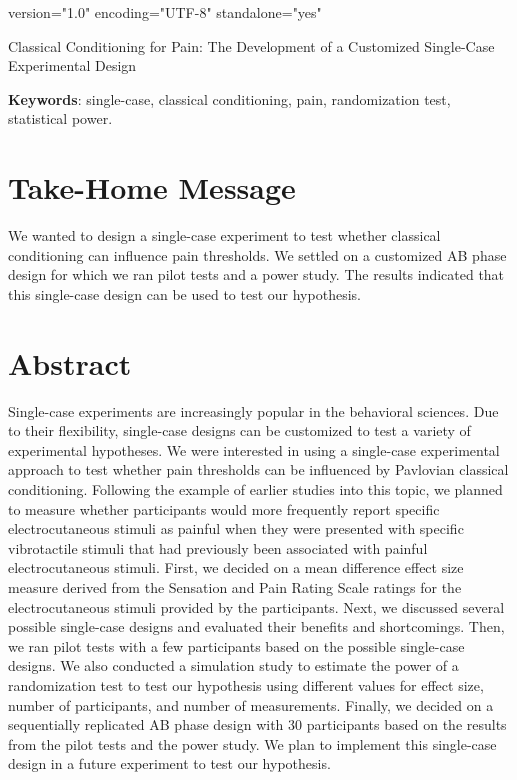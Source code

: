 version="1.0" encoding="UTF-8" standalone="yes" \documentclass{article}
\begin{document}
  

Classical Conditioning for Pain: The Development of a Customized Single-Case Experimental Design









\textbf{Keywords}: single-case, classical conditioning, pain, randomization test, statistical power.

\section{Take-Home Message}

We wanted to design a single-case experiment to test whether classical conditioning can influence pain thresholds. We settled on a customized AB phase design for which we ran pilot tests and a power study. The results indicated that this single-case design can be used to test our hypothesis.

\section{Abstract}

Single-case experiments are increasingly popular in the behavioral sciences. Due to their flexibility, single-case designs can be customized to test a variety of experimental hypotheses. We were interested in using a single-case experimental approach to test whether pain thresholds can be influenced by Pavlovian classical conditioning. Following the example of earlier studies into this topic, we planned to measure whether participants would more frequently report specific electrocutaneous stimuli as painful when they were presented with specific vibrotactile stimuli that had previously been associated with painful electrocutaneous stimuli. First, we decided on a mean difference effect size measure derived from the Sensation and Pain Rating Scale ratings for the electrocutaneous stimuli provided by the participants. Next, we discussed several possible single-case designs and evaluated their benefits and shortcomings. Then, we ran pilot tests with a few participants based on the possible single-case designs. We also conducted a simulation study to estimate the power of a randomization test to test our hypothesis using different values for effect size, number of participants, and number of measurements. Finally, we decided on a sequentially replicated AB phase design with 30 participants based on the results from the pilot tests and the power study. We plan to implement this single-case design in a future experiment to test our hypothesis. 
\end{document}
